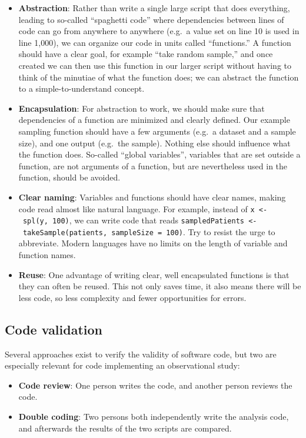 \documentclass[11pt]{book}
\providecommand{\tightlist}{%
  \setlength{\itemsep}{0pt}\setlength{\parskip}{0pt}}
\theoremstyle{definition}
\theoremstyle{definition}
\theoremstyle{definition}
\theoremstyle{remark}
\begin{document}
\begin{itemize}
\tightlist
\item
  \textbf{Abstraction}: Rather than write a single large script that does everything, leading to so-called ``spaghetti code'' where dependencies between lines of code can go from anywhere to anywhere (e.g.~a value set on line 10 is used in line 1,000), we can organize our code in units called ``functions.'' A function should have a clear goal, for example ``take random sample,'' and once created we can then use this function in our larger script without having to think of the minutiae of what the function does; we can abstract the function to a simple-to-understand concept.
\item
  \textbf{Encapsulation}: For abstraction to work, we should make sure that dependencies of a function are minimized and clearly defined. Our example sampling function should have a few arguments (e.g.~a dataset and a sample size), and one output (e.g.~the sample). Nothing else should influence what the function does. So-called ``global variables'', variables that are set outside a function, are not arguments of a function, but are nevertheless used in the function, should be avoided.
\item
  \textbf{Clear naming}: Variables and functions should have clear names, making code read almost like natural language. For example, instead of \texttt{x\ \textless{}-\ spl(y,\ 100)}, we can write code that reads \texttt{sampledPatients\ \textless{}-\ takeSample(patients,\ sampleSize\ =\ 100)}. Try to resist the urge to abbreviate. Modern languages have no limits on the length of variable and function names.
\item
  \textbf{Reuse}: One advantage of writing clear, well encapsulated functions is that they can often be reused. This not only saves time, it also means there will be less code, so less complexity and fewer opportunities for errors.
\end{itemize}

\hypertarget{code-validation}{%
\subsection{Code validation}\label{code-validation}}

Several approaches exist to verify the validity of software code, but two are especially relevant for code implementing an observational study:

\begin{itemize}
\tightlist
\item
  \textbf{Code review}: One person writes the code, and another person reviews the code.
\item
  \textbf{Double coding}: Two persons both independently write the analysis code, and afterwards the results of the two scripts are compared.
\end{itemize}
\end{document}
